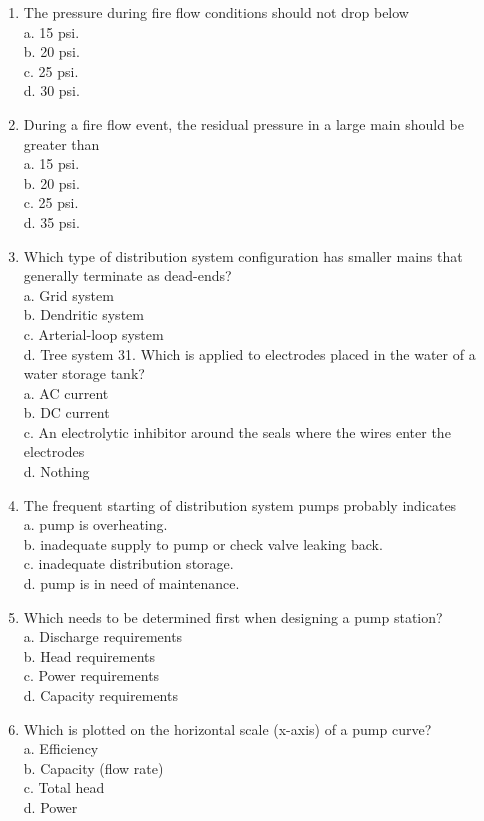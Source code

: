\documentclass[10pt]{article}
\begin{document}
\begin{enumerate}
  \item The pressure during fire flow conditions should not drop below\\
a. 15 psi.\\
b. 20 psi.\\
c. 25 psi.\\
d. 30 psi.

  \item During a fire flow event, the residual pressure in a large main should be greater than\\
a. 15 psi.\\
b. 20 psi.\\
c. 25 psi.\\
d. 35 psi.

  \item Which type of distribution system configuration has smaller mains that generally terminate as dead-ends?\\
a. Grid system\\
b. Dendritic system\\
c. Arterial-loop system\\
d. Tree system 31. Which is applied to electrodes placed in the water of a water storage tank?\\
a. AC current\\
b. DC current\\
c. An electrolytic inhibitor around the seals where the wires enter the electrodes\\
d. Nothing

  \item The frequent starting of distribution system pumps probably indicates\\
a. pump is overheating.\\
b. inadequate supply to pump or check valve leaking back.\\
c. inadequate distribution storage.\\
d. pump is in need of maintenance.

  \item Which needs to be determined first when designing a pump station?\\
a. Discharge requirements\\
b. Head requirements\\
c. Power requirements\\
d. Capacity requirements

  \item Which is plotted on the horizontal scale (x-axis) of a pump curve?\\
a. Efficiency\\
b. Capacity (flow rate)\\
c. Total head\\
d. Power


\end{enumerate}
\end{document}
